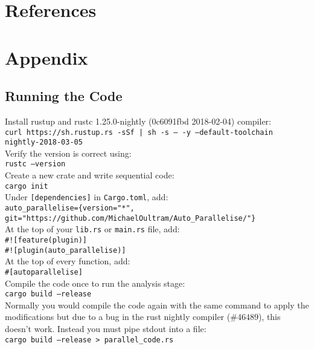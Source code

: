 \chapter{References}
\printbibliography[heading=none]

\chapter{Appendix}

\section{Running the Code}
\label{sec:running-the-code}
Install rustup and rustc 1.25.0-nightly (0c6091fbd 2018-02-04) compiler: \\
\texttt{curl https://sh.rustup.rs -sSf | sh -s -- -y --default-toolchain nightly-2018-03-05} \\

Verify the version is correct using: \\
\texttt{rustc --version} \\

Create a new crate and write sequential code: \\
\texttt{cargo init} \\

Under \texttt{[dependencies]} in \texttt{Cargo.toml}, add: \\
\texttt{auto\_parallelise=\{version="*", git="https://github.com/MichaelOultram/Auto\_Parallelise/"\}} \\

At the top of your \texttt{lib.rs} or \texttt{main.rs} file, add: \\
\texttt{\#![feature(plugin)]} \\
\texttt{\#![plugin(auto\_parallelise)]} \\

At the top of every function, add: \\
\texttt{\#[autoparallelise]} \\

Compile the code once to run the analysis stage: \\
\texttt{cargo build --release} \\

Normally you would compile the code again with the same command to apply the modifications but due to a bug in the rust nightly compiler (\href{https://github.com/rust-lang/rust/issues/46489}{$\#46489$}), this doesn't work. Instead you must pipe stdout into a file: \\
\texttt{cargo build --release > parallel\_code.rs} \\

